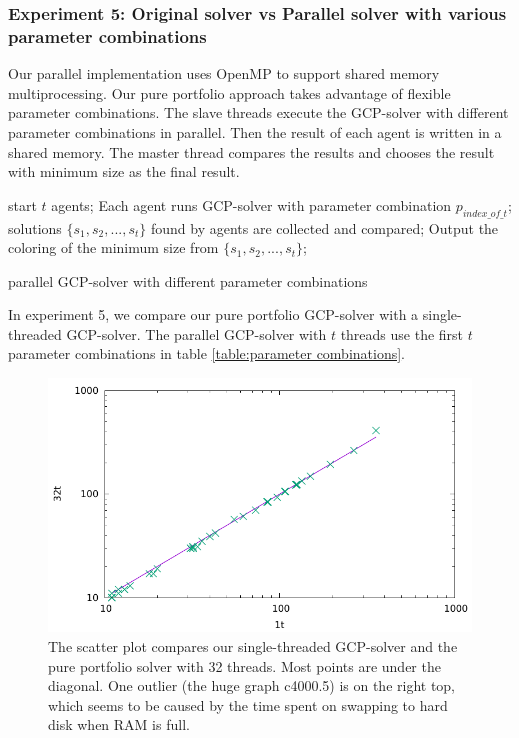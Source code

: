\documentclass[12pt,a4paper,twoside]{scrartcl}
\numberwithin{equation}{section}
\begin{document}
\clearpage
\subsubsection{Experiment 5: Original solver vs Parallel solver with various parameter combinations}
Our parallel implementation uses OpenMP to support shared memory multiprocessing. Our pure portfolio approach takes advantage of flexible parameter combinations. The slave threads execute the GCP-solver with different parameter combinations in parallel. Then the result of each agent is written in a shared memory. The master thread compares the results and chooses the result with minimum size as the final result.

\begin{algorithm}[H]
start $t$ agents;\;
Each agent runs GCP-solver with parameter combination $p_{index\_of \_t}$;\;
solutions $\{s_1, s_2,...,s_t\}$ found by agents are collected and compared;\;
Output the coloring of the minimum size from $\{s_1, s_2,..., s_t\}$;\;
 \caption{parallel GCP-solver with different parameter combinations}
 \end{algorithm}
In experiment 5, we compare our pure portfolio GCP-solver with a single-threaded GCP-solver. The parallel GCP-solver with $t$ threads use the first $t$ parameter combinations in table \ref{table:parameter combinations}.
\begin{figure}[h!]
\centering
  \includegraphics[scale = 1]{Experiments/E5/scalog.pdf}
      \caption{The scatter plot compares our single-threaded GCP-solver and the pure portfolio solver with 32 threads. Most points are under the diagonal. One outlier (the huge graph c4000.5) is on the right top, which seems to be caused by the time spent on swapping to hard disk when RAM is full.}
\end{figure} 
\end{document}
